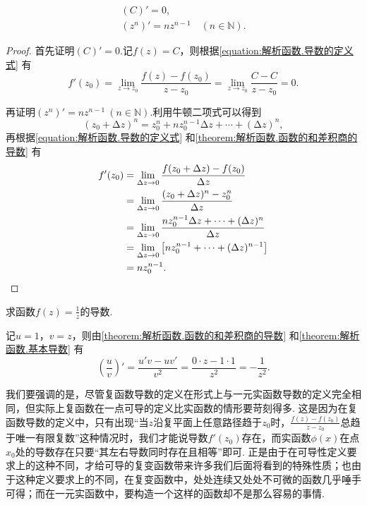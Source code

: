 \begin{theorem}\label{theorem:解析函数.基本导数}
\begin{gather}
(C)' = 0, \\
(z^n)' = n z^{n-1} \quad (n\in\mathbb{N}).
\end{gather}
\begin{proof}
首先证明\((C)' = 0\).记\(f(z) = C\)，则根据\cref{equation:解析函数.导数的定义式} 有\begin{equation*}
f'(z_0) = \lim_{z \to z_0} \frac{f(z)-f(z_0)}{z-z_0}
= \lim_{z \to z_0} \frac{C-C}{z-z_0} = 0.
\end{equation*}

再证明\((z^n)' = n z^{n-1}\ (n\in\mathbb{N})\).利用牛顿二项式可以得到\begin{equation*}
(z_0 + \increment z)^n = z_0^n + n z_0^{n-1} \increment z + \dotsb + (\increment z)^n,
\end{equation*}再根据\cref{equation:解析函数.导数的定义式} 和\cref{theorem:解析函数.函数的和差积商的导数} 有\begin{align*}
f'(z_0) &= \lim_{\Delta z\to0} \frac{f(z_0+\Delta z)-f(z_0)}{\Delta z} \\
&= \lim_{\Delta z\to0} \frac{(z_0+\Delta z)^n-z_0^n}{\Delta z} \\
&= \lim_{\Delta z\to0} \frac{n z_0^{n-1} \Delta z + \dotsb + (\Delta z)^n}{\Delta z} \\
&= \lim_{\Delta z\to0} \left[ n z_0^{n-1} + \dotsb + (\Delta z)^{n-1} \right] \\
&= n z_0^{n-1}.
\qedhere
\end{align*}
\end{proof}
\end{theorem}

\begin{example}
求函数\(f(z) = \frac{1}{z}\)的导数.
\begin{solution}
记\(u = 1\)，\(v = z\)，则由\cref{theorem:解析函数.函数的和差积商的导数} 和\cref{theorem:解析函数.基本导数} 有\begin{equation*}
\left(\frac{u}{v}\right)' = \frac{u' v - u v'}{v^2}
= \frac{0 \cdot z - 1 \cdot 1}{z^2}
= - \frac{1}{z^2}.
\end{equation*}
\end{solution}
\end{example}

我们要强调的是，尽管复函数导数的定义在形式上与一元实函数导数的定义完全相同，但实际上复函数在一点可导的定义比实函数的情形要苛刻得多.
这是因为在复函数导数的定义中，只有出现“当\(z\)沿复平面上任意路径趋于\(z_0\)时，\(\frac{f(z) - f(z_0)}{z - z_0}\)总趋于唯一有限复数”这种情况时，我们才能说导数\(f'(z_0)\)存在，而实函数\(\phi(x)\)在点\(x_0\)处的导数存在只要“其左右导数同时存在且相等”即可.
正是由于在可导性定义要求上的这种不同，才给可导的复变函数带来许多我们后面将看到的特殊性质；也由于这种定义要求上的不同，在复变函数中，处处连续又处处不可微的函数几乎唾手可得；而在一元实函数中，要构造一个这样的函数却不是那么容易的事情.

